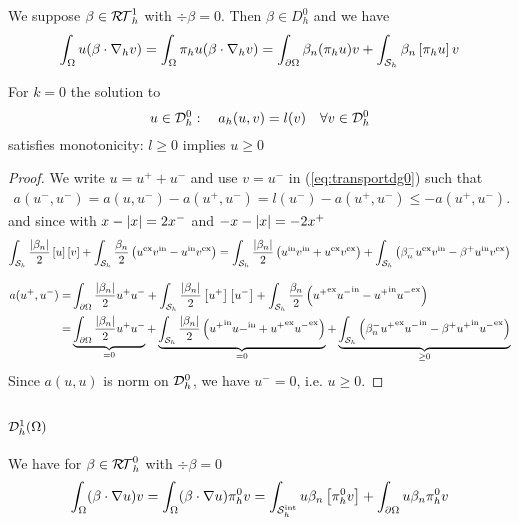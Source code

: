 We suppose $\beta\in \mathcal{R\!T}^1_h$ with $\div\beta=0$. Then $\beta\in D^0_h$ and we have
%
\begin{align*}
\int_{\Omega}u (\beta\cdot\nabla_h v) = \int_{\Omega}\pi_h u (\beta\cdot\nabla_h v) = 
\int_{\partial\Omega}\beta_n (\pi_h u) v +  \int_{\mathcal S_h}\beta_n \left[\pi_h u\right] v
\end{align*}
%
\begin{corollary}\label{cor:}
For $k=0$ the solution to
%
%
\begin{equation}\label{eq:transportdg0}
u\in \mathcal{D}_h^0:\quad a_h(u,v) = l(v)\quad \forall v\in \mathcal{D}_h^0
\end{equation}
%
satisfies monotonicity: $l\ge0$ implies $u\ge0$
\end{corollary}
%
\begin{proof}
We write $u=u^+ + u^-$ and use $v=u^-$ in (\ref{eq:transportdg0}) such that
%
\begin{align*}
a(u^-,u^-) = a(u,u^-) - a(u^+,u^-) = l(u^-) - a(u^+,u^-) \le - a(u^+,u^-).
\end{align*}
%
and since with $x-\left|x\right|=2x^-$ and $-x-\left|x\right|=-2x^+$
%
\begin{align*}
\int_{\mathcal S_h}\frac{\left|\beta_n\right|}{2}\left[u\right] \left[v\right]
+ \int_{\mathcal S_h}\frac{\beta_n}{2}\left({u}^{\rm ex}{v}^{\rm in}-{u}^{\rm in}{v}^{\rm ex}\right)=
\int_{\mathcal S_h}\frac{\left|\beta_n\right|}{2}\left( {u}^{\rm in}{v}^{\rm in} + {u}^{\rm ex}{v}^{\rm ex}\right)
+  \int_{\mathcal S_h} \left( \beta_n^- {u}^{\rm ex}{v}^{\rm in} - \beta^+{u}^{\rm in}{v}^{\rm ex} \right)
\end{align*}
%

%
\begin{align*}
a(u^+,u^-) =& \int_{\partial\Omega} \frac{\left|\beta_n\right|}{2} u^+u^- + \int_{\mathcal S_h}\frac{\left|\beta_n\right|}{2}\left[u^+\right] \left[u^-\right]
+ \int_{\mathcal S_h}\frac{\beta_n}{2}\left({u^+}^{\rm ex}{u^-}^{\rm in}-{u^+}^{\rm in}{u^-}^{\rm ex}\right)\\
=& \underbrace{\int_{\partial\Omega} \frac{\left|\beta_n\right|}{2} u^+u^-}_{=0} +
\underbrace{\int_{\mathcal S_h}\frac{\left|\beta_n\right|}{2}\left( {u^+}^{\rm in}{u-}^{\rm in} + {u^+}^{\rm ex}{u^-}^{\rm ex}\right)}_{=0}
+  \underbrace{\int_{\mathcal S_h} \left( \beta_n^- {u^+}^{\rm ex}{u^-}^{\rm in} - \beta^+{u^+}^{\rm in}{u^-}^{\rm ex} \right)}_{\ge0}
\end{align*}
%
Since $a(u,u)$ is norm on $\mathcal{D}_h^0$, we have $u^-=0$, i.e. $u\ge0$.
\end{proof}
%
\subsection{$\mathcal{D}^1_h(\Omega)$}\label{subsec:}
%
We have for $\beta\in\mathcal{R\!T}^0_h$ with $\div\beta=0$
%
\begin{align*}
\int_{\Omega} (\beta\cdot\nabla u)v = \int_{\Omega} (\beta\cdot\nabla u)\pi_h^0v
=  \int_{\mathcal S^{\rm int}_h} u\beta_n \left[\pi_h^0v\right] + \int_{\partial\Omega}u \beta_n\pi_h^0v
\end{align*}
%

